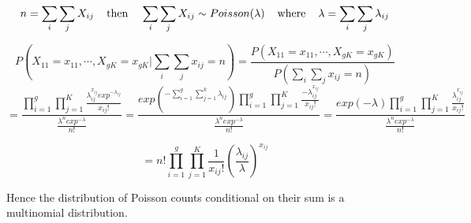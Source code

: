 \documentclass[12pt,oneside]{report}
\theoremstyle{definition}
\theoremstyle{mystyle}
\begin{document}
\begin{equation*}
 n=\sum\limits_{i}\sum\limits_{j}X_{ij} \hspace{4mm}\text{then}\hspace{4mm} \sum\limits_{i}\sum\limits_{j}X_{ij} \sim Poisson(\lambda) \hspace{4mm} \text{where}\hspace{4mm} \lambda=\sum\limits_{i}\sum\limits_{j}\lambda_{ij}
\end{equation*}




\begin{equation*}
P(X_{11}=x_{11},\cdots,X_{gK}=x_{gK}|\sum\limits_{i}\sum\limits_{j}x_{ij}=n)=\displaystyle\frac{P(X_{11}=x_{11},\cdots,X_{gK}=x_{gK})}{P(\sum\limits_{i}\sum\limits_{j}x_{ij}=n)}
\end{equation*}
\begin{equation*}
=\displaystyle\frac{ \prod\limits _{i=1}^{g}\prod\limits _{j=1}^{K}\frac{\lambda_{ij}^{x_{ij}}exp^{-\lambda_{ij}}}{x_{ij}!}}{\frac{\lambda^{n}exp^{-\lambda}}{n!}}=\displaystyle\frac{ exp\left(^{-\sum\limits _{i=1}^{g}\sum\limits _{j=1}^{k}\lambda_{ij} }\right)\displaystyle  \prod\limits _{i=1}^{g}\prod\limits _{j=1}^{K}\frac{-\lambda_{ij}^{x_{ij}}}{x_{ij}!} }{\frac{\lambda^{n}exp^{-\lambda}}{n!}}=\displaystyle \frac{exp(-\lambda)\displaystyle  \prod\limits _{i=1}^{g}\prod\limits _{j=1}^{K}\frac{\lambda_{ij}^{x_{ij}}}{x_{ij}!} }{\frac{\lambda^{n}exp^{-\lambda}}{n!}}
\end{equation*}

\begin{equation*}
=n!\displaystyle\prod\limits _{i=1}^{g}\prod\limits _{j=1}^{K}\frac{1}{x_{ij}!}\left(\frac{\lambda_{ij}}{\lambda}\right)^{x_{ij}}
\end{equation*}

Hence the distribution of Poisson counts conditional on their sum is a multinomial distribution.
\end{document}
